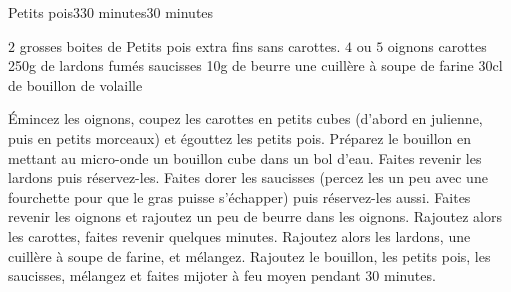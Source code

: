 \begin{recette}{Petits pois}{3}{30 minutes}{30 minutes}
\begin{ingredients}
\ingredient $2$ grosses boites de Petits pois extra fins sans carottes. 
\ingredient $4$ ou $5$ oignons
 carottes
\ingredient 250g de lardons fumés
 saucisses
\ingredient 10g de beurre
\ingredient une cuillère à soupe de farine
\ingredient 30cl de bouillon de volaille
\end{ingredients}

\begin{preparation}
\etape Émincez les oignons, coupez les carottes en petits cubes (d'abord en julienne, puis en petits morceaux) et égouttez les petits pois. Préparez le bouillon en mettant au micro-onde un bouillon cube dans un bol d'eau.
\etape Faites revenir les lardons puis réservez-les. Faites dorer les saucisses (percez les un peu avec une fourchette pour que le gras puisse s'échapper) puis réservez-les aussi.
\etape Faites revenir les oignons et rajoutez un peu de beurre dans les oignons.
\etape Rajoutez alors les carottes, faites revenir quelques minutes.
\etape Rajoutez alors les lardons, une cuillère à soupe de farine, et mélangez.
\etape Rajoutez le bouillon, les petits pois, les saucisses, mélangez et faites mijoter à feu moyen pendant 30 minutes.
\end{preparation}

\end{recette}

